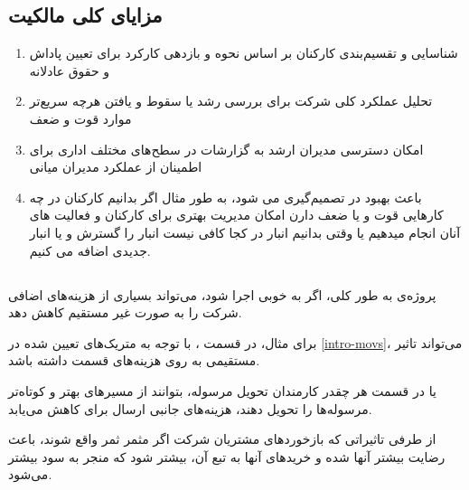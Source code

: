 \documentclass[12pt, dvipsnames, svgnames, x11names,]{article}
\begin{document}
\subsection{مزایای کلی مالکیت }
\begin{enumerate}
    \item 
    شناسایی و تقسیم‌بندی کارکنان بر اساس نحوه و بازدهی کارکرد برای تعیین پاداش و حقوق عادلانه
    \item 
    تحلیل عملکرد کلی شرکت برای بررسی رشد یا سقوط و یافتن هرچه سریع‌تر موارد قوت و ضعف
    \item 
    امکان دسترسی مدیران ارشد به گزارشات در سطح‌های مختلف اداری برای اطمینان از عملکرد مدیران میانی 
    \item 
باعث بهبود در تصمیم‌گیری می شود، به طور مثال اگر بدانیم کارکنان در چه کارهایی قوت و یا ضعف دارن امکان مدیریت بهتری برای کارکنان و فعالیت های آنان انجام میدهیم یا وقتی بدانیم انبار در کجا کافی نیست انبار را گسترش و یا انبار جدیدی اضافه می کنیم.
\end{enumerate}
\subsection{}

پروژه‌ی  به طور کلی، اگر به خوبی اجرا شود، می‌تواند بسیاری از هزینه‌های اضافی شرکت  را به صورت غیر مستقیم کاهش دهد.

برای مثال، در قسمت ، با توجه به متریک‌های تعیین شده در \ref{intro-movs}، 
می‌تواند تاثیر مستقیمی به روی هزینه‌های قسمت  داشته باشد.

یا در قسمت  هر چقدر کارمندان تحویل مرسوله، بتوانند از مسیر‌های بهتر و کوتاه‌تر مرسوله‌ها را تحویل دهند، هزینه‌های جانبی ارسال برای  کاهش می‌یابد.

از طرفی تاثیراتی که بازخورد‌های مشتریان شرکت اگر مثمر ثمر واقع شوند، باعث رضایت بیشتر آنها شده و خرید‌‌های آنها به تبع آن، بیشتر شود که منجر به سود بیشتر 
می‌شود.
\end{document}
